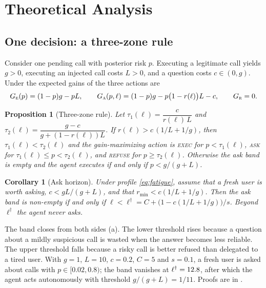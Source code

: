 \documentclass[10pt]{article}
\newcommand{\ASK}{\textup{\textsc{ask}}\xspace}
\newcommand{\EXEC}{\textup{\textsc{exec}}\xspace}
\newcommand{\REFUSE}{\textup{\textsc{refuse}}\xspace}
\theoremstyle{plain}
\newtheorem{proposition}{Proposition}
\newtheorem{corollary}{Corollary}
\theoremstyle{definition}
\begin{document}
\section{Theoretical Analysis}\label{sec:theory}

\subsection{One decision: a three-zone rule}\label{sec:onestep}

Consider one pending call with posterior risk $p$. Executing a legitimate call yields $g>0$, executing an injected call costs $L>0$, and a question costs $c\in(0,g)$. Under  the expected gains of the three actions are
\begin{equation}\label{eq:gains}
G_{\textsc{e}}(p)=(1-p)g-pL,\qquad
G_{\textsc{a}}(p,\ell)=(1-p)g-p\bigl(1-r(\ell)\bigr)L-c,\qquad
G_{\textsc{r}}=0.
\end{equation}

\begin{proposition}[Three-zone rule]\label{prop:zones}
Let $\tau_1(\ell)=\dfrac{c}{r(\ell)\,L}$ and $\tau_2(\ell)=\dfrac{g-c}{g+(1-r(\ell))L}$. If $r(\ell)>c\,(1/L+1/g)$, then $\tau_1(\ell)<\tau_2(\ell)$ and the gain-maximizing action is \EXEC for $p<\tau_1(\ell)$, \ASK for $\tau_1(\ell)\le p<\tau_2(\ell)$, and \REFUSE for $p\ge\tau_2(\ell)$. Otherwise the ask band is empty and the agent executes if and only if $p<g/(g+L)$.
\end{proposition}

\begin{corollary}[Ask horizon]\label{cor:horizon}
Under profile \eqref{eq:fatigue}, assume that a fresh user is worth asking, $c<gL/(g+L)$, and that $r_{\min}<c(1/L+1/g)$. Then the ask band is non-empty if and only if $\ell<\ell^\dagger=C+\bigl(1-c(1/L+1/g)\bigr)/s$. Beyond $\ell^\dagger$ the agent never asks.
\end{corollary}

The band closes from both sides (a). The lower threshold rises because a question about a mildly suspicious call is wasted when the answer becomes less reliable. The upper threshold falls because a risky call is better refused than delegated to a tired user. With $g=1$, $L=10$, $c=0.2$, $C=5$ and $s=0.1$, a fresh user is asked about calls with $p\in[0.02,0.8)$; the band vanishes at $\ell^\dagger=12.8$, after which the agent acts autonomously with threshold $g/(g+L)=1/11$. Proofs are in .
\end{document}
